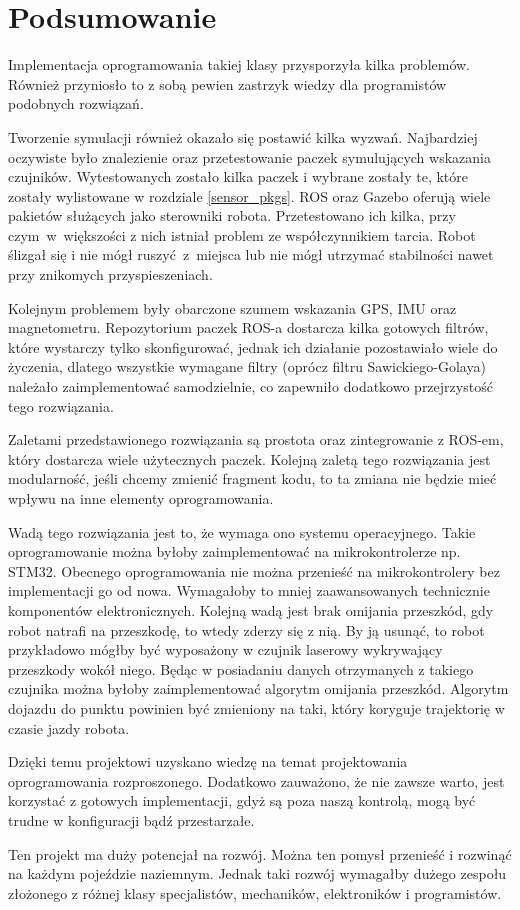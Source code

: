 \newpage
\section{Podsumowanie}
{
    Implementacja oprogramowania takiej klasy przysporzyła kilka problemów. Również przyniosło to z sobą pewien zastrzyk wiedzy dla programistów podobnych rozwiązań.

    Tworzenie symulacji również okazało się postawić kilka wyzwań. Najbardziej oczywiste było znalezienie oraz przetestowanie paczek symulujących wskazania czujników. Wytestowanych zostało kilka paczek i wybrane zostały te, które zostały wylistowane w rozdziale \ref{sensor_pkgs}. ROS oraz Gazebo oferują wiele pakietów służących jako sterowniki robota. Przetestowano ich kilka, przy czym~w~większości z nich istniał problem ze współczynnikiem tarcia. Robot ślizgał się i nie mógł ruszyć~z~miejsca lub nie mógł utrzymać stabilności  nawet przy znikomych przyspieszeniach.
    
    Kolejnym problemem były obarczone szumem wskazania GPS, IMU oraz magnetometru. Repozytorium paczek ROS-a dostarcza kilka gotowych filtrów, które wystarczy tylko skonfigurować, jednak ich działanie pozostawiało wiele do życzenia, dlatego wszystkie wymagane filtry (oprócz filtru Sawickiego-Golaya) należało zaimplementować samodzielnie, co zapewniło dodatkowo przejrzystość tego rozwiązania.
    
    Zaletami przedstawionego rozwiązania są prostota oraz zintegrowanie z ROS-em, który dostarcza wiele użytecznych paczek. Kolejną zaletą tego rozwiązania jest modularność, jeśli chcemy zmienić fragment kodu, to ta zmiana nie będzie mieć wpływu na inne elementy oprogramowania.
    
    Wadą tego rozwiązania jest to, że wymaga ono systemu operacyjnego. Takie oprogramowanie można byłoby zaimplementować na mikrokontrolerze np. STM32. Obecnego oprogramowania nie można przenieść na mikrokontrolery bez implementacji go od nowa.
    Wymagałoby to mniej zaawansowanych technicznie komponentów elektronicznych. Kolejną wadą jest brak omijania przeszkód, gdy robot natrafi na przeszkodę, to wtedy zderzy się z nią. By ją usunąć, to robot przykładowo mógłby być wyposażony w czujnik laserowy wykrywający przeszkody wokół niego. Będąc w posiadaniu danych otrzymanych z takiego czujnika można byłoby zaimplementować algorytm omijania przeszkód. Algorytm dojazdu do punktu powinien być zmieniony na taki, który koryguje trajektorię w czasie jazdy robota.
    
    Dzięki temu projektowi uzyskano wiedzę na temat projektowania oprogramowania rozproszonego. Dodatkowo zauważono, że nie zawsze warto, jest korzystać z gotowych implementacji, gdyż są poza naszą kontrolą, mogą być trudne w konfiguracji bądź przestarzałe.
    
    Ten projekt ma duży potencjał na rozwój. Można ten pomysł przenieść i rozwinąć na każdym pojeździe naziemnym. Jednak taki rozwój wymagałby dużego zespołu złożonego z różnej klasy specjalistów, mechaników, elektroników i programistów.
}